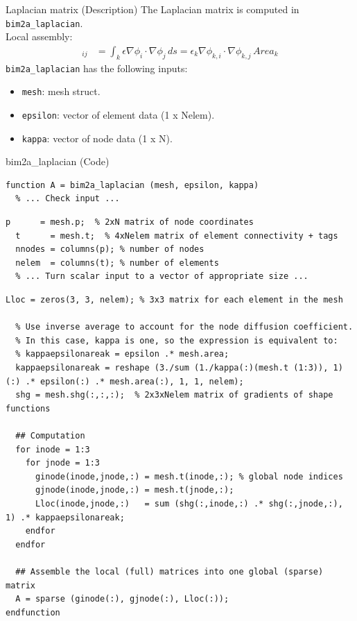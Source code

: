 \documentclass[aspectratio=54,xcolor=dvipsnames]{beamer}
\begin{document}
\begin{frame}{Laplacian matrix (Description)}
    The Laplacian matrix is computed in \texttt{bim2a\_laplacian}. \\
    Local assembly:
    \begin{align*}
        [L^{k}]_{ij} &= \int_{k} \epsilon \nabla \phi_i \cdot \nabla \phi_j \, ds = \epsilon_k \nabla \phi_{k,i} \cdot \nabla \phi_{k,j} \, Area_k
    \end{align*}
    \texttt{bim2a\_laplacian} has the following inputs:
    \begin{itemize}
        \item \texttt{mesh}: mesh struct.
        \item \texttt{epsilon}: vector of element data (1 x Nelem).
        \item \texttt{kappa}: vector of node data (1 x N).
    \end{itemize}

\end{frame}

\begin{frame}[fragile]{bim2a\_laplacian (Code)}
\scriptsize
\begin{lstlisting}[firstnumber=41]
function A = bim2a_laplacian (mesh, epsilon, kappa)
  % ... Check input ...
\end{lstlisting}
\begin{lstlisting}[firstnumber=51]
  p      = mesh.p;  % 2xN matrix of node coordinates
  t      = mesh.t;  % 4xNelem matrix of element connectivity + tags
  nnodes = columns(p); % number of nodes
  nelem  = columns(t); % number of elements
  % ... Turn scalar input to a vector of appropriate size ...
\end{lstlisting}
\begin{lstlisting}[firstnumber=69]
  Lloc = zeros(3, 3, nelem); % 3x3 matrix for each element in the mesh

  % Use inverse average to account for the node diffusion coefficient.
  % In this case, kappa is one, so the expression is equivalent to:
  % kappaepsilonareak = epsilon .* mesh.area;
  kappaepsilonareak = reshape (3./sum (1./kappa(:)(mesh.t (1:3)), 1)(:) .* epsilon(:) .* mesh.area(:), 1, 1, nelem);
  shg = mesh.shg(:,:,:);  % 2x3xNelem matrix of gradients of shape functions
  
  ## Computation
  for inode = 1:3
    for jnode = 1:3
      ginode(inode,jnode,:) = mesh.t(inode,:); % global node indices
      gjnode(inode,jnode,:) = mesh.t(jnode,:);
      Lloc(inode,jnode,:)   = sum (shg(:,inode,:) .* shg(:,jnode,:), 1) .* kappaepsilonareak;
    endfor
  endfor

  ## Assemble the local (full) matrices into one global (sparse) matrix
  A = sparse (ginode(:), gjnode(:), Lloc(:));
endfunction
\end{lstlisting}
\end{frame}
\end{document}
